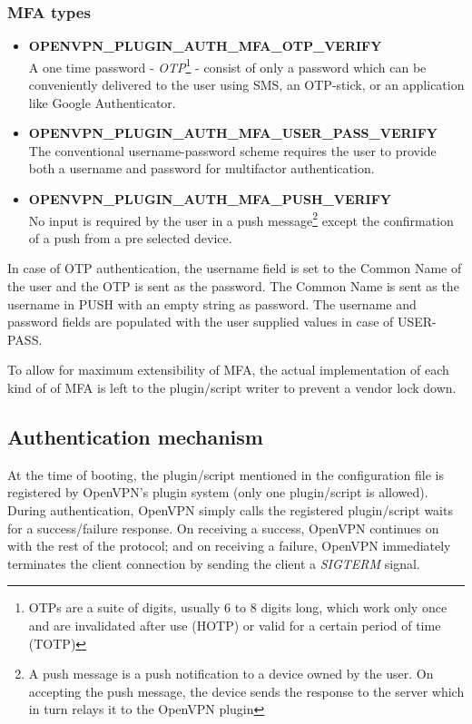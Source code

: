 \documentclass[11pt,oneside]{book}
\begin{document}
\subsubsection{MFA types}
\begin{itemize}
    \item \textbf{OPENVPN\_PLUGIN\_AUTH\_MFA\_OTP\_VERIFY} \\
        A one time password - \emph{OTP}\footnote{OTPs are a suite of digits, usually 6 to 8 digits
        long, which work only once and are invalidated after use (HOTP\cite{HOTP}) or valid for a
    certain period of time (TOTP\cite{TOTP})} - consist of only a password which can be conveniently
        delivered to the user using SMS, an OTP-stick, or an application like Google Authenticator.
    \item \textbf{OPENVPN\_PLUGIN\_AUTH\_MFA\_USER\_PASS\_VERIFY} \\
        The conventional username-password scheme requires the user to provide
        both a username and password for multifactor authentication.
    \item \textbf{OPENVPN\_PLUGIN\_AUTH\_MFA\_PUSH\_VERIFY} \\
        No input is required by the user in a push message\footnote{A push message is a push
        notification to a device owned by the user. On accepting the push message, the device
        sends the response to the server which in turn relays it to the OpenVPN plugin} except
        the confirmation of a push from a pre selected device.
\end{itemize}

In case of OTP authentication, the username field is set to the Common Name of the user and the OTP
is sent as the password. The Common Name is sent as the username in PUSH with an empty string as
password. The username and password fields are populated with the user supplied values in case of
USER-PASS.

To allow for maximum extensibility of MFA, the actual implementation of each kind of of MFA
is left to the plugin/script writer to prevent a vendor lock down.

\subsection{Authentication mechanism}
\label{MFA:Mechanism}
At the time of booting, the plugin/script mentioned in the configuration file is registered
by OpenVPN's plugin system (only one plugin/script is allowed). During authentication, OpenVPN
simply calls the registered plugin/script waits for a success/failure response. On receiving a
success, OpenVPN continues on with the rest of the protocol; and on receiving a failure, OpenVPN
immediately terminates the client connection by sending the client a \emph{SIGTERM} signal.
\end{document}
